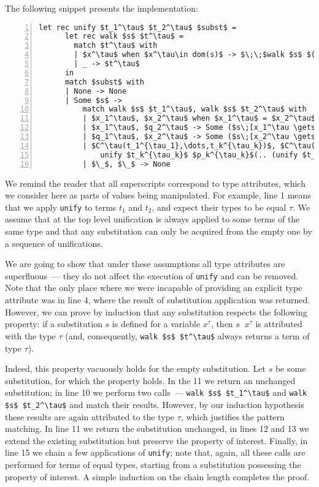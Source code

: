 The following snippet presents the implementation:

\begin{lstlisting}[mathescape=true,numbers=left,numberstyle=\small,stepnumber=1,numbersep=-5pt]
    let rec unify $t_1^\tau$ $t_2^\tau$ $subst$ =
      let rec walk $s$ $t^\tau$ =
        match $t^\tau$ with
        | $x^\tau$ when $x^\tau\in dom(s)$ -> $\;\;$walk $s$ $(s\;\;x^\tau)$
        | _ -> $t^\tau$
      in
      match $subst$ with
      | None -> None
      | Some $s$ ->
          match walk $s$ $t_1^\tau$, walk $s$ $t_2^\tau$ with
          | $x_1^\tau$, $x_2^\tau$ when $x_1^\tau$ = $x_2^\tau$ -> $subst$
          | $x_1^\tau$, $q_2^\tau$ -> Some ($s\;[x_1^\tau \gets q_2^\tau]$)
          | $q_1^\tau$, $x_2^\tau$ -> Some ($s\;[x_2^\tau \gets q_1^\tau]$)
          | $C^\tau(t_1^{\tau_1},\dots,t_k^{\tau_k})$, $C^\tau(p_1^{\tau_1},\dots,p_k^{\tau_k})$ ->
              unify $t_k^{\tau_k}$ $p_k^{\tau_k}$(.. (unify $t_1^{\tau_1}$ $p_1^{\tau_1}$ $subst$)$..$)
          | $\_$, $\_$ -> None
\end{lstlisting}

We remind the reader that all superscripts correspond to type attributes, which we consider here as
parts of values being manipulated. For example, line 1 means that we apply \lstinline{unify}
to terms $t_1$ and $t_2$, and expect their types to be equal $\tau$. We assume that
at the top level unification is always applied to some terms of the same type and that any
substitution can only be acquired from the empty one by a sequence of unifications.

We are going to show that under these assumptions all type attributes are superfluous~--- they
do not affect the execution of \lstinline{unify} and can be removed. Note that the only place where we
were incapable of providing an explicit type attribute was in line 4, where the result of
substitution application was returned. However, we can prove by induction that any substitution
respects the following property: if a substitution $s$ is defined for a variable $x^\tau$,
then $s\;\;x^\tau$ is attributed with the type $\tau$ (and, consequently, \lstinline{walk $s$ $t^\tau$} always
returns a term of type $\tau$).

Indeed, this property vacuously holds for the empty substitution. Let $s$ be some substitution, for which the
property holds. In the 11 we return an unchanged substitution; in line 10 we perform two calls~---
\lstinline{walk $s$ $t_1^\tau$} and \lstinline{walk $s$ $t_2^\tau$} and match their results. However,
by our induction hypothesis these results are again attributed to the type $\tau$, which justifies the
pattern matching. In line 11 we return the substitution unchanged, in lines 12 and 13 we extend the
existing substitution but preserve the property of interest. Finally, in line 15 we chain a few
applications of \lstinline{unify}; note that, again, all these calls are performed for terms of equal
types, starting from a substitution possessing the property of interest. A simple induction on the
chain length completes the proof.

